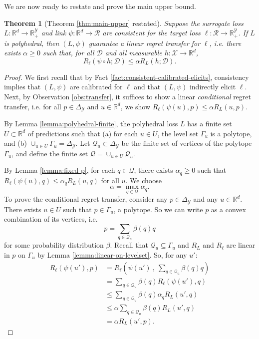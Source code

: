 \documentclass{article}
\newtheorem{theorem}{Theorem}
\theoremstyle{definition}\newtheorem{definition}{Definition}
\theoremstyle{definition}\newtheorem{assumption}{Assumption}
\newcommand{\reals}{\mathbb{R}}
\newcommand{\simplex}{\Delta_\Y}
\newcommand{\D}{\mathcal{D}}
\newcommand{\R}{\mathcal{R}}
\newcommand{\X}{\mathcal{X}}
\newcommand{\Y}{\mathcal{Y}}
\begin{document}
We are now ready to restate and prove the main upper bound.
\begin{theorem}[Theorem \ref{thm:main-upper} restated]
  Suppose the surrogate loss $L: \reals^d \to \reals_+^{\Y}$ and link $\psi: \reals^d \to \R$ are consistent for the target loss $\ell: \R \to \reals_+^{\Y}$.
  If $L$ is polyhedral, then $(L,\psi)$ guarantee a linear regret transfer for $\ell$, i.e. there exists $\alpha \geq 0$ such that, for all $\D$ and all measurable $h: \X \to \reals^d$,
    \[ R_{\ell}(\psi \circ h ; \D) \leq \alpha R_L(h ; \D) . \]
\end{theorem}
\begin{proof}
  We first recall that by Fact \ref{fact:consistent-calibrated-elicits}, consistency implies that $(L,\psi)$ are calibrated for $\ell$ and that $(L,\psi)$ indirectly elicit $\ell$.
  Next, by Observation \ref{obs:transfer}, it suffices to show a linear \emph{conditional} regret transfer, i.e. for all $p \in \simplex$ and $u \in \reals^d$, we show $R_{\ell}(\psi(u),p) \leq \alpha R_L(u,p)$.
  
  By Lemma \ref{lemma:polyhedral-finite}, the polyhedral loss $L$ has a finite set $U \subset \reals^d$ of predictions such that (a) for each $u \in U$, the level set $\Gamma_u$ is a polytope, and (b) $\cup_{u \in U} \Gamma_u = \simplex$.
  Let $\mathcal{Q}_u \subset \simplex$ be the finite set of vertices of the polytope $\Gamma_u$, and define the finite set $\mathcal{Q} = \cup_{u \in U} \mathcal{Q}_u$.
  
  By Lemma \ref{lemma:fixed-p}, for each $q \in \mathcal{Q}$, there exists $\alpha_q \geq 0$ such that $R_{\ell}(\psi(u),q) \leq \alpha_q R_L(u,q)$ for all $u$.
  We choose
    \[ \alpha = \max_{q \in \mathcal{Q}} \alpha_q . \]
  To prove the conditional regret transfer, consider any $p \in \simplex$ and any $u \in \reals^d$.
  There exists $u \in U$ such that $p \in \Gamma_u$, a polytope.
  So we can write $p$ as a convex combination of its vertices, i.e.
    \[ p = \sum_{q \in \mathcal{Q}_u} \beta(q) q \]
  for some probability distribution $\beta$.
  Recall that $\mathcal{Q}_u \subseteq \Gamma_u$ and $R_L$ and $R_{\ell}$ are linear in $p$ on $\Gamma_u$ by Lemma \ref{lemma:linear-on-levelset}.
  So, for any $u'$:
  \begin{align*}
    R_{\ell}(\psi(u'),p)
    &=    R_{\ell}\left(\psi(u') ~,~ \sum_{q \in \mathcal{Q}_u} \beta(q) q\right)  \\
    &=    \sum_{q \in \mathcal{Q}_u} \beta(q) R_{\ell}(\psi(u'),q)  \\
    &\leq \sum_{q \in \mathcal{Q}_u} \beta(q) \alpha_{q} R_L(u',q)  \\
    &\leq \alpha \sum_{q \in \mathcal{Q}_u} \beta(q) R_L(u',q)  \\
    &=    \alpha R_L(u', p) .
  \end{align*}
\end{proof}
\end{document}

